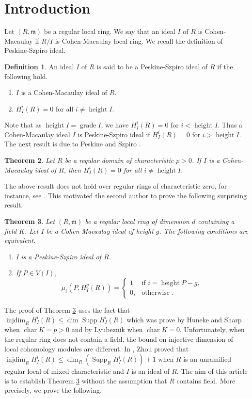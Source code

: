 \documentclass[12pt,reqno]{amsart}
\newtheorem{theorem}{Theorem}[section]
\theoremstyle{definition}
\newtheorem{definition}[theorem]{Definition}
\newcommand{\m}{\mathfrak{m}}
\newcommand{\grade}{\operatorname{grade}}
\newcommand{\injdim}{\operatorname{injdim}}
\newcommand{\height}{\operatorname{height}}
\newcommand{\Supp}{\operatorname{Supp}}
\newcommand{\Char}{\operatorname{char}}
\begin{document}
\section{Introduction}
Let $(R,\m)$ be a regular local ring. We say that an ideal $I$ of $R$ is Cohen-Macaulay if $R/I$ is Cohen-Macaulay local ring. We recall the definition of Peskine-Szpiro ideal.
\begin{definition}
    An ideal $I$ of $R$ is said to be a Peskine-Szpiro ideal of $R$ if the following hold.
    \begin{enumerate}
        \item $I$ is a Cohen-Macaulay ideal of $R$.
        \item $H^i_I(R)=0$ for all $i\neq \height I$.
    \end{enumerate}
\end{definition}
Note that as $\height I=\grade I$, we have $H^i_I(R)=0$ for $i<\height I$. Thus a Cohen-Macaulay ideal $I$ is Peskine-Szpiro ideal if $H^i_I(R)=0$ for $i>\height I$. The next result is due to Peskine and Szpiro \cite[Proposition III.4.1]{PS73}.
\begin{theorem}\label{Peskineszpiro result}
    Let $R$ be a regular domain of characteristic $p>0$. If $I$ is a Cohen-Macaulay ideal of $R$, then $H^i_I(R)=0$ for all $i\neq \height I$.
\end{theorem}
The above result does not hold over regular rings of characteristic zero, for instance, see \cite[Example 21.31]{ILL+07}. This motivated the second author to prove the following surprising result.
\begin{theorem} \cite[Theorem 1.2]{Put24}\label{put24 main result}
    Let $(R,\m)$ be a regular local ring of dimension $d$ containing a field $K$. Let $I$ be a Cohen-Macaulay ideal of height $g$. The following conditions are equivalent.
    \begin{enumerate}[label=(\alph*), font=\upshape]
        \item I is a Peskine-Szpiro ideal of $R$.
        \item If $P\in V(I)$,
         $$
\mu_i(P,H^g_I(R)) =
\begin{cases}
1 & \text{if } i=\height P-g,\\
0, & \text{otherwise }.
\end{cases}
$$
    \end{enumerate}
\end{theorem}
The proof of Theorem \ref{put24 main result} uses the fact that $\injdim_R H^i_I(R)\leq \dim\Supp H^i_I(R)$ which was prove by Huneke and Sharp \cite{HS93} when $\Char K=p>0$ and by Lyubeznik \cite{Lyu93} when $\Char K=0$. Unfortunately, when the regular ring  does not contain a field, the bound on injective dimension of local cohomology modules are different. In \cite{CZ98}, Zhou proved that  $\injdim_RH^i_I(R)\leq \dim_R(\Supp_R H^i_I(R))+1$ when $R$ is an unramified regular local of mixed characteristic and $I$ is an ideal of $R$. The aim of this article is to establish Theorem \ref{put24 main result} without the assumption that $R$ contains field. More precisely, we prove the following.
\end{document}
